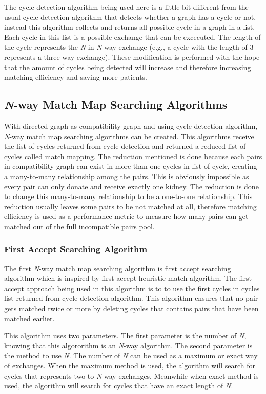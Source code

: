 \documentclass[conference]{IEEEtran}
\begin{document}
The cycle detection algorithm being used here is a little bit different from the usual cycle detection algorithm that detects
whether a graph has a cycle or not, instead this algorithm collects and returns all possible cycle in a graph in a list.
Each cycle in this list is a possible exchange that can be excecuted. The length of the cycle represents the \textit{N} in
\textit{N}-way exchange (e.g., a cycle with the length of 3 represents a three-way exchange).
These modification is performed with the hope that the amount of cycles being detected will
increase and therefore increasing matching efficiency and saving more patients.

\subsection{\textit{N}-way Match Map Searching Algorithms}
With directed graph as compatibility graph and using cycle detection algorithm, \textit{N}-way match map searching algorithms
can be created. This algorithms receive the list of cycles returned from cycle detection and returned a reduced list of cycles
called match mapping. The reduction mentioned is done because each pairs in compatibility graph can exist in more than one cycles
in list of cycle, creating a many-to-many relationship among the pairs. This is obviously impossible as every pair can only donate
and receive exactly one kidney. The reduction is done to change this many-to-many relationship to be a one-to-one relationship. This
reduction usually leaves some pairs to be not matched at all, therefore matching efficiency is used as a performance metric to
measure how many pairs can get matched out of the full incompatible pairs pool.  

\subsubsection{First Accept Searching Algorithm}
The first \textit{N}-way match map searching algorithm is first accept searching algorithm which is inspired by first accept
heuristic match algorithm. The first-accept approach being used in this algorithm is to to use the first cycles in cycles list
returned from cycle detection algorithm. This algorithm ensures that no pair gets matched twice or more by deleting cycles that
contains pairs that have been matched earlier.

This algorithm uses two parameters. The first parameter is the number of \textit{N}, knowing that this algororithm is an \textit{N}-way
algorithm. The second parameter is the method to use \textit{N}. The number of \textit{N} can be used as a maximum or exact way of exchanges.
When the maximum method is used, the algorithm will search for cycles that represents two-to-\textit{N}-way exchanges. Meanwhile when exact
method is used, the algorithm will search for cycles that have an exact length of \textit{N}.  
\end{document}
